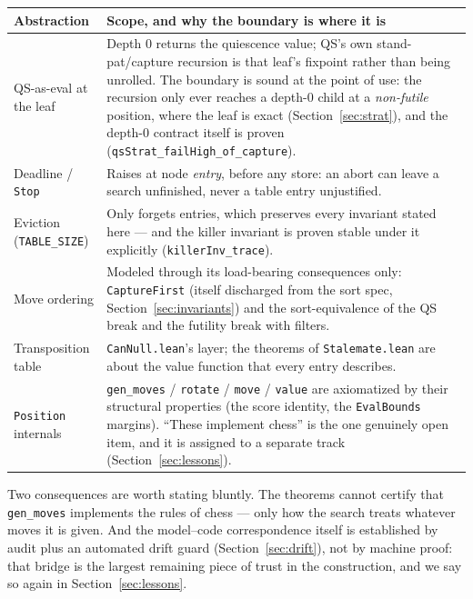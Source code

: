 \documentclass[11pt]{article}
\theoremstyle{plain}
\theoremstyle{definition}
\theoremstyle{remark}
\begin{document}
\begin{center}
\footnotesize
\begin{tabular}{@{}lp{9.4cm}@{}}
\toprule
\textbf{Abstraction} & \textbf{Scope, and why the boundary is where it is}\\
\midrule
QS-as-eval at the leaf &
Depth 0 returns the quiescence value; QS's own stand-pat/capture
recursion is that leaf's fixpoint rather than being unrolled.  The
boundary is sound at the point of use: the recursion only ever reaches
a depth-0 child at a \emph{non-futile} position, where the leaf is
exact (Section~\ref{sec:strat}), and the depth-0 contract itself is
proven (\texttt{qsStrat\_failHigh\_of\_capture}).\\
\addlinespace
Deadline / \texttt{Stop} &
Raises at node \emph{entry}, before any store: an abort can leave a
search unfinished, never a table entry unjustified.\\
\addlinespace
Eviction (\texttt{TABLE\_SIZE}) &
Only forgets entries, which preserves every invariant stated here ---
and the killer invariant is proven stable under it explicitly
(\texttt{killerInv\_trace}).\\
\addlinespace
Move ordering &
Modeled through its load-bearing consequences only:
\texttt{CaptureFirst} (itself discharged from the sort spec,
Section~\ref{sec:invariants}) and the sort-equivalence of the QS break
and the futility break with filters.\\
\addlinespace
Transposition table &
\texttt{CanNull.lean}'s layer; the theorems of
\texttt{Stalemate.lean} are about the value function that every entry
describes.\\
\addlinespace
\texttt{Position} internals &
\texttt{gen\_moves} / \texttt{rotate} / \texttt{move} / \texttt{value}
are axiomatized by their structural properties (the score identity, the
\texttt{EvalBounds} margins).  ``These implement chess'' is the one
genuinely open item, and it is assigned to a separate track
(Section~\ref{sec:lessons}).\\
\bottomrule
\end{tabular}
\end{center}

\noindent
Two consequences are worth stating bluntly.  The theorems cannot
certify that \texttt{gen\_moves} implements the rules of chess --- only
how the search treats whatever moves it is given.  And the
model--code correspondence itself is established by audit plus an
automated drift guard (Section~\ref{sec:drift}), not by machine proof:
that bridge is the largest remaining piece of trust in the
construction, and we say so again in Section~\ref{sec:lessons}.
\end{document}

